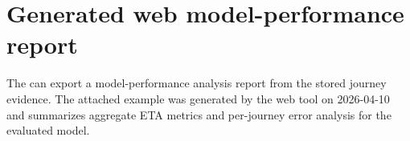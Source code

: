 \chapter{Generated web model-performance report}
\label{ap:web-performance-report}

The \WebApp{} can export a model-performance analysis report from the stored journey evidence. The attached example was generated by the web tool on 2026-04-10 and summarizes aggregate ETA metrics and per-journey error analysis for the evaluated model.

